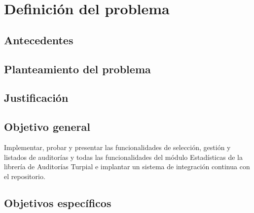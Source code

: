 \chapter{\textbf{Definición del problema}}

\thispagestyle{empty}

\section{Antecedentes}
\section{Planteamiento del problema}
\section{Justificación}

\section{Objetivo general}

Implementar, probar y presentar las funcionalidades de selección, gestión y listados de auditorías y todas las funcionalidades del módulo Estadísticas de la librería de Auditorías Turpial e implantar un sistema de integración continua con el repositorio.  

\section{Objetivos específicos}


